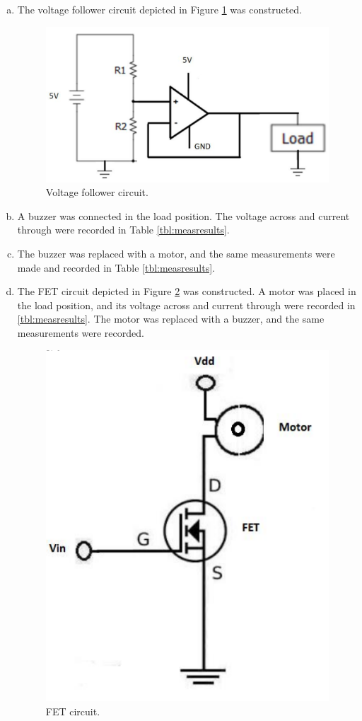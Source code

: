 \documentclass[12pt]{article}
\begin{document}
\begin{enumerate}[a.]
    \item The voltage follower circuit depicted in Figure \ref{fig:vfollow} was constructed. 
    \begin{figure}[H]
        \centering
        \includegraphics[width=\linewidth]{vfollow.png}
        \caption{Voltage follower circuit.}
        \label{fig:vfollow}
    \end{figure}
        
    \item A buzzer was connected in the load position. The voltage across and current 
        through were recorded in Table \ref{tbl:measresults}.
    \item The buzzer was replaced with a motor, and the same measurements were made and 
        recorded in Table \ref{tbl:measresults}.
    \item The FET circuit depicted in Figure \ref{fig:fet} was constructed. A motor was placed 
        in the load position, and its voltage across and current through were recorded in 
        \ref{tbl:measresults}. The motor was replaced with a buzzer, and the same 
        measurements were recorded.
        \begin{figure}[H]
            \centering
            \includegraphics[width=0.3\linewidth]{fet.png}
            \caption{FET circuit.}
            \label{fig:fet}
        \end{figure}
        
\end{enumerate}
\end{document}
